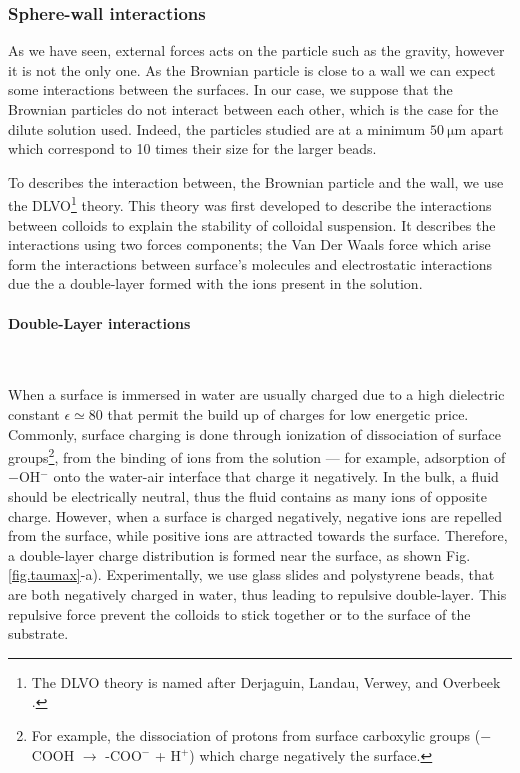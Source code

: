 \subsubsection{Sphere-wall interactions}

As we have seen, external forces acts on the particle such as the gravity, however it is not the only one. As the Brownian particle is close to a wall we can expect some interactions between the surfaces. In our case, we suppose that the Brownian particles do not interact between each other, which is the case for the dilute solution used. Indeed, the particles studied are at a minimum $50 ~ \mathrm{\mu m}$ apart which correspond to 10 times their size for the larger beads. 

To describes the interaction between, the Brownian particle and the wall, we use the DLVO\footnote{The DLVO theory is named after Derjaguin, Landau, Verwey, and Overbeek \cite{israelachvili_intermolecular_2015}.} theory. This theory was first developed to describe the interactions between colloids to explain the stability of colloidal suspension. It describes the interactions using two forces components; the Van Der Waals force which arise form the interactions between surface's molecules and electrostatic interactions due the a double-layer formed with the ions present in the solution. 

\paragraph{Double-Layer interactions}\mbox{}\\
\vspace{0.10cm}


When a surface is immersed in water are usually charged \cite{israelachvili_intermolecular_2015} due to a high dielectric constant $\epsilon \simeq 80$ that permit the build up of charges for low energetic price. Commonly, surface charging is done through ionization of dissociation of surface groups\footnote{For example, the dissociation of protons from surface carboxylic groups \cite{israelachvili_intermolecular_2015} ($-$COOH $\rightarrow$ -COO$^-$ + H$^+$) which charge negatively the surface.}, from the binding of ions from the solution --- for example, adsorption of $-$OH$^-$ onto the water-air interface that charge it negatively. In the bulk, a fluid should be electrically neutral, thus the fluid contains as many ions of opposite charge. However, when a surface is charged negatively, negative ions are repelled from the surface, while positive ions are attracted towards the surface.  Therefore, a double-layer charge distribution is formed near the surface, as shown Fig.\ref{fig.taumax}-a). Experimentally, we use glass slides and polystyrene beads, that are both negatively charged in water, thus leading to repulsive double-layer. This repulsive force prevent the colloids to stick together or to the surface of the substrate. 






